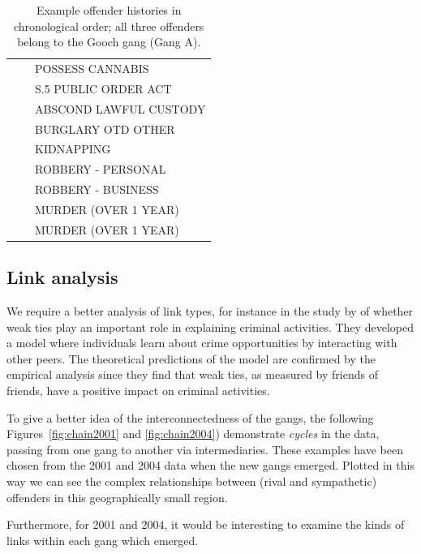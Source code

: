 \documentclass[twocolumn]{svjour3}          %
\theoremstyle{definition}
\begin{document}
\begin{table}[!ht]
{\begin{tabular}{lll}
          &       & POSSESS CANNABIS       \\
          &       & S.5 PUBLIC ORDER ACT   \\
          &       & ABSCOND LAWFUL CUSTODY \\
          &       & BURGLARY OTD OTHER     \\
          &       & KIDNAPPING             \\
          &       & ROBBERY - PERSONAL     \\
          &       & ROBBERY - BUSINESS     \\
          &       & MURDER (OVER 1 YEAR)   \\
          &       & MURDER (OVER 1 YEAR)   \\
    \end{tabular}}
 \caption{Example offender histories in chronological order; all three offenders belong to
   the Gooch gang (Gang A).}
  \label{tab:histories}
\end{table}


\subsection{Link analysis}

We require a better analysis of link types, for instance in the study
by \citet{PatacchiniZenou2008} of whether weak ties play an important
role in explaining criminal activities. They developed a model where
individuals learn about crime opportunities by interacting with other
peers. The theoretical predictions of the model are confirmed by the
empirical analysis since they find that weak ties, as measured by
friends of friends, have a positive impact on criminal activities.

To give a better idea of the interconnectedness of the gangs, the
following Figures~\ref{fig:chain2001} and \ref{fig:chain2004}) demonstrate
\emph{cycles} in the data, passing from one gang to another via
intermediaries.  These examples have been chosen from the 2001 and
2004 data when the new gangs emerged. Plotted in this way we can see
the complex relationships between (rival and sympathetic) offenders in
this geographically small region.

Furthermore, for 2001 and 2004, it would be interesting to examine the
kinds of links within each gang which emerged.
\end{document}
